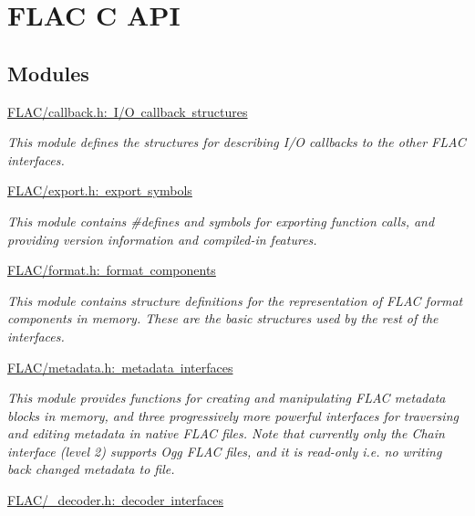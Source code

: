 \hypertarget{group__flac}{}\section{F\+L\+AC C A\+PI}
\label{group__flac}
\subsection*{Modules}
\begin{DoxyCompactItemize}
\item 
\mbox{\hyperlink{group__flac__callbacks}{F\+L\+A\+C/callback.\+h\+: I/\+O callback structures}}
\begin{DoxyCompactList}\small\item\em This module defines the structures for describing I/O callbacks to the other F\+L\+AC interfaces. \end{DoxyCompactList}\item 
\mbox{\hyperlink{group__flac__export}{F\+L\+A\+C/export.\+h\+: export symbols}}
\begin{DoxyCompactList}\small\item\em This module contains \#defines and symbols for exporting function calls, and providing version information and compiled-\/in features. \end{DoxyCompactList}\item 
\mbox{\hyperlink{group__flac__format}{F\+L\+A\+C/format.\+h\+: format components}}
\begin{DoxyCompactList}\small\item\em This module contains structure definitions for the representation of F\+L\+AC format components in memory. These are the basic structures used by the rest of the interfaces. \end{DoxyCompactList}\item 
\mbox{\hyperlink{group__flac__metadata}{F\+L\+A\+C/metadata.\+h\+: metadata interfaces}}
\begin{DoxyCompactList}\small\item\em This module provides functions for creating and manipulating F\+L\+AC metadata blocks in memory, and three progressively more powerful interfaces for traversing and editing metadata in native F\+L\+AC files. Note that currently only the Chain interface (level 2) supports Ogg F\+L\+AC files, and it is read-\/only i.\+e. no writing back changed metadata to file. \end{DoxyCompactList}\item 
\mbox{\hyperlink{group__flac__decoder}{F\+L\+A\+C/\+\_\+decoder.\+h\+: decoder interfaces}}

\end{DoxyCompactItemize}
